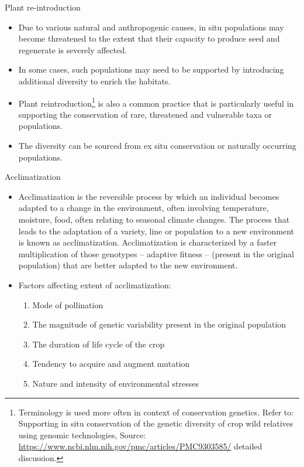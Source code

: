 \documentclass[11pt,ignorenonframetext,aspectratio=169]{beamer}
\providecommand{\tightlist}{%
  \setlength{\itemsep}{0pt}\setlength{\parskip}{0pt}}
\begin{document}
\begin{frame}{Plant re-introduction}
\protect\hypertarget{plant-re-introduction}{}
\begin{itemize}
\item
  Due to various natural and anthropogenic causes, in situ populations
  may become threatened to the extent that their capacity to produce
  seed and regenerate is severely affected.
\item
  In some cases, such populations may need to be supported by
  introducing additional diversity to enrich the habitats.
\item
  Plant
  reintroduction\footnote[frame]{Terminology is used more often in context of conservation genetics. Refer to: Supporting in situ conservation of the genetic diversity of crop wild relatives using genomic technologies, Source: \url{https://www.ncbi.nlm.nih.gov/pmc/articles/PMC9303585/} detailed discussion.}
  is also a common practice that is particularly useful in supporting
  the conservation of rare, threatened and vulnerable taxa or
  populations.
\item
  The diversity can be sourced from ex situ conservation or naturally
  occurring populations.
\end{itemize}
\end{frame}

\begin{frame}{Acclimatization}
\protect\hypertarget{acclimatization}{}
\begin{itemize}
\item
  Acclimatization is the reversible process by which an individual
  becomes adapted to a change in the environment, often involving
  temperature, moisture, food, often relating to seasonal climate
  changes. The process that leads to the adaptation of a variety, line
  or population to a new environment is known as acclimatization.
  Acclimatization is characterized by a faster multiplication of those
  genotypes -- adaptive fitness -- (present in the original population)
  that are better adapted to the new environment.
\item
  Factors affecting extent of acclimatization:

  \begin{enumerate}
  \tightlist
  \item
    Mode of pollination
  \item
    The magnitude of genetic variability present in the original
    population
  \item
    The duration of life cycle of the crop
  \item
    Tendency to acquire and augment mutation
  \item
    Nature and intensity of environmental stresses
  \end{enumerate}
\end{itemize}
\end{frame}
\end{document}
